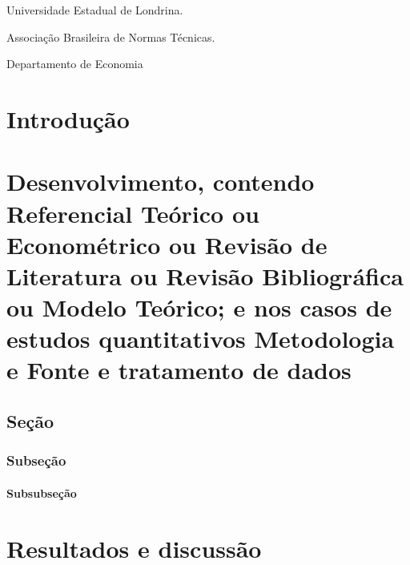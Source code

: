 \documentclass[12pt,oneside,a4paper,chapter=TITLE,english,brazil,sumario=abnt-6027-2012]{abntex2}
\begin{document}
\listoftables*
\cleardoublepage


\begin{siglas}
	\item[UEL] Universidade Estadual de Londrina. 
	\item[ABNT] Associação Brasileira de Normas Técnicas.
\end{siglas}
\pagebreak


\begin{simbolos}
	\item[Depeco] Departamento de Economia
\end{simbolos}
\pagebreak


\tableofcontents*
\cleardoublepage


\textual %
\pagestyle{simple}

\chapter{Introdução}


\chapter{ Desenvolvimento, contendo Referencial Teórico ou Econométrico ou Revisão de Literatura ou Revisão Bibliográfica ou Modelo Teórico; e nos casos de 	estudos quantitativos Metodologia e Fonte e tratamento de dados}

\section{Seção}

\subsection{Subseção}

\subsubsection{Subsubseção}

\chapter{Resultados e discussão}
\end{document}
